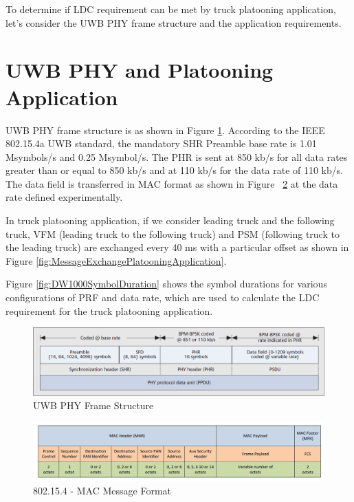 To determine if LDC requirement can be met by truck platooning application, let's consider the UWB PHY frame structure and the application requirements.

\section{UWB PHY and Platooning Application}
UWB PHY frame structure is as shown in Figure \ref{fig:UWBPHYframeStructure}. According to the IEEE 802.15.4a UWB standard, the mandatory SHR Preamble base rate is 1.01 Msymbols/s and 0.25 Msymbol/s. The PHR is sent at 850 kb/s for all data rates greater than or equal to 850 kb/s and at 110 kb/s for the data rate of 110 kb/s.
The data field is transferred in MAC format as shown in Figure ~\ref{fig:MACMessageFormat} at the data rate defined experimentally. 

In truck platooning application, if we consider leading truck and the following truck, VFM (leading truck to the following truck) and PSM (following truck to the leading truck) are exchanged every 40 ms with a particular offset as shown in Figure \ref{fig:MessageExchangePlatooningApplication}.

Figure \ref{fig:DW1000SymbolDuration} shows the symbol durations for various configurations of PRF and data rate, which are used to calculate the LDC requirement for the truck platooning application.

\begin{figure}[htbp]
    \begin{center}
        \includegraphics[width=1\textwidth]{figures/Picture4.png}
        \caption[UWB PHY Frame Structure]{UWB PHY Frame Structure \protect \cite{karapistoli2010overview}}
        \label{fig:UWBPHYframeStructure}
    \end{center}
\end{figure}

\begin{figure}[htbp]
    \begin{center}
        \includegraphics[width=1\textwidth]{figures/Picture5.png}
        \caption[802.15.4 - MAC Message Format]{802.15.4 - MAC Message Format \protect \cite{DW1000UserManual}}
        \label{fig:MACMessageFormat}
    \end{center}
\end{figure}

